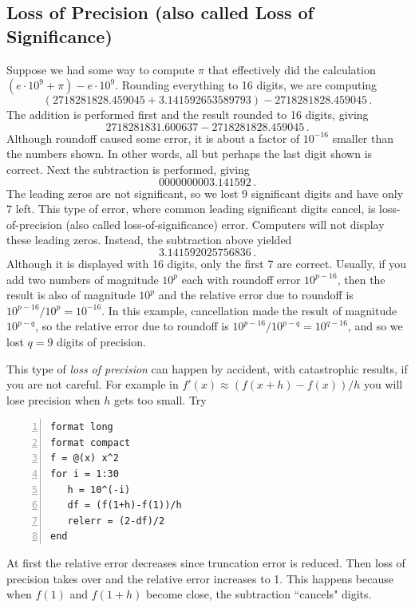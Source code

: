 
\subsection*{Loss of Precision (also called Loss of Significance)}

Suppose we had some way
to compute \(\pi\)
that effectively did the calculation
\((e\cdot10^{9}+\pi)-e\cdot10^{9}\). Rounding everything to 16 digits, 
we are computing
\[
(2718281828.459045
+3.141592653589793)
-2718281828.459045\,.
\]
The addition is performed first and the result rounded to 16 digits, giving
\[
 2718281831.600637 %
-2718281828.459045
\,.
\]
Although roundoff caused some error, it is about a factor of
\(10^{-16}\)
smaller than the numbers shown. In other words, all but perhaps the
last digit shown is correct.
Next the subtraction is performed, giving
\[
 00 00 00 00 03.141592
\,.
\]
The leading zeros are not significant, so we lost 9 significant digits
and have only 7 left.  This type of error, where common leading
significant digits cancel, is loss-of-precision (also called
loss-of-significance) error.
Computers will not display these leading zeros. Instead, the subtraction above yielded  
\[
3.141592025756836
\,.
\]
Although it is displayed with 16 digits, only the first 7 are correct.
%
Usually, if you add two numbers of magnitude \(10^p\) each with roundoff error \(10^{p-16}\), then the result is also of magnitude \(10^p\) and the relative error due to roundoff is \(10^{p-16}/10^p=10^{-16}\).
In this example, cancellation made the result of magnitude \(10^{p-q}\), so the relative error due to roundoff is \(10^{p-16}/10^{p-q}=10^{q-16}\), and so we lost $q=9$ digits of precision.

This type of {\em loss of
  precision}\/ can happen by accident, with catastrophic results, if
you are not careful. For example in $f'(x)\approx (f(x+h)-f(x))/h$ you
will lose precision when $h$ gets too small. Try
\begin{lstlisting}[frame=none,numbers=left]
format long
format compact
f = @(x) x^2
for i = 1:30
   h = 10^(-i)
   df = (f(1+h)-f(1))/h
   relerr = (2-df)/2
end
\end{lstlisting}
At first the relative error decreases since truncation error is reduced. Then
loss of precision takes over and the relative error increases to 1. This happens because when
$f(1)$ and $f(1+h)$ become close, the subtraction ``cancels" digits.



